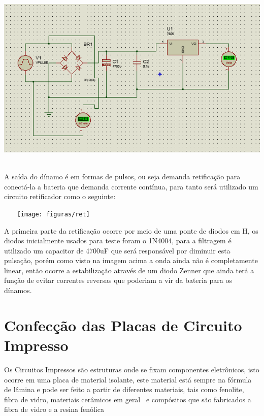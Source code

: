    \begin{center}
        \includegraphics[scale=0.7]{figuras/Fonte-5V}
    \label{Fonte.5V}
\end{center}

A saída do dínamo é em formas de pulsos, ou seja demanda retificação para conectá-la a bateria que demanda corrente contínua, para tanto será utilizado um circuito retificador como o seguinte: 


\begin{center}
    \texttt{[image: figuras/ret]}
       \label{ret}
   \end{center}

A primeira parte da retificação ocorre por meio de uma ponte de diodos em H, os diodos inicialmente usados para teste foram o 1N4004, para a filtragem é utilizado um capacitor de 4700uF que será responsável por diminuir esta pulsação, porém como visto na imagem acima a onda ainda não é completamente linear, então ocorre a estabilização através de um diodo Zenner que ainda terá a função de evitar correntes reversas que poderiam a vir da bateria para os dínamos. 

\section{Confecção das Placas de Circuito Impresso}

Os Circuitos Impressos são estruturas onde se fixam componentes eletrônicos, isto ocorre em uma placa de material isolante, este material está sempre na fórmula de lâmina e pode ser feito a partir de diferentes materiais, tais como fenolite, fibra de vidro, materiais cerâmicos em geral  e compósitos que são fabricados a fibra de vidro e a resina fenólica %


